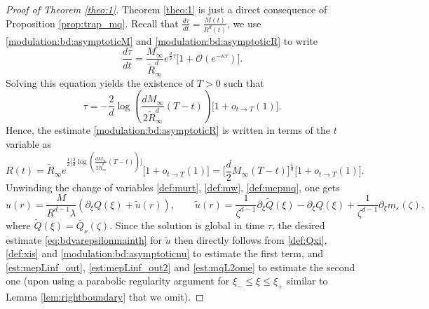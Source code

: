 \documentclass[11pt]{aims}
\theoremstyle{definition}
\newcommand{\Oc}{\mathcal{O}}
\newcommand{\pa}{\partial}
\numberwithin{equation}{section}
\begin{document}
\begin{proof}[Proof of Theorem \ref{theo:1}] Theorem \ref{theo:1} is just a direct consequence of Proposition \ref{prop:trap_mq}. Recall that $\frac{d\tau}{dt} = \frac{M(t)}{R^d(t)}$, we use \eqref{modulation:bd:asymptoticM} and \eqref{modulation:bd:asymptoticR} to write
$$\frac{d \tau}{dt} = \frac{M_\infty}{\tilde{R}_\infty^d  } e^{\frac{d}{2}\tau} \big[1 + \Oc(e^{-\kappa \tau})\big].$$
Solving this equation yields the existence of $T > 0$ such that
\begin{equation}\label{eq:reltauT}
\tau =   - \frac{2}{d} \log \left( \frac{d M_\infty}{2 \tilde{R}_\infty^d } (T-t) \right)\big[1 + o_{t \to T}(1)\big].
\end{equation}
Hence, the estimate \eqref{modulation:bd:asymptoticR} is written in terms of the $t$ variable as
$$
R(t) = \tilde{R}_\infty e^{ \frac{1}{2} \Big[\frac{2}{d} \log \left( \frac{d M_\infty}{2 \tilde{R}_\infty^d } (T-t) \right)\Big] } \big[1 + o_{t \to T}(1)\big] = \big[\frac d2 M_\infty (T-t)\big]^\frac{1}{d}\big[1 + o_{t \to T}(1)\big]. 
$$
Unwinding the change of variables \eqref{def:murt}, \eqref{def:mw}, \eqref{def:mepmq}, one gets
$$
u(r)=\frac{M}{R^{d-1}\lambda}(\pa_\xi Q(\xi)+\tilde u(r)), \qquad \tilde u(r)=\frac{1}{\zeta^{d-1}} \pa_\xi \tilde Q(\xi)-\pa_\xi Q(\xi)+\frac{1}{\zeta^{d-1}}\pa_\xi m_\varepsilon (\zeta),
$$
where $\tilde Q(\xi)=\bar Q_\nu(\zeta)$. Since the solution is global in time $\tau$, the desired estimate \eqref{eq:bdvarepsilonmainth} for $\tilde u$ then directly follows from \eqref{def:Qxi}, \eqref{def:xis} and \eqref{modulation:bd:asymptoticnu} to estimate the first term, and \eqref{est:mepLinf_out}, \eqref{est:mepLinf_out2} and \eqref{est:mqL2ome} to estimate the second one (upon using a parabolic regularity argument for $\xi_{-}\leq \xi \leq \xi_+$ similar to Lemma \ref{lem:rightboundary} that we omit).


\end{proof}
\end{document}
